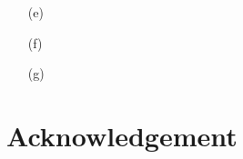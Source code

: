\documentclass[10pt, a4paper]{article}
\begin{document}
\begin{enumerate}
  \item[(e)] 
  \item[(f)]
  \item[(g)]

\end{enumerate}




\section{Acknowledgement}


\makereferences


\end{document}
